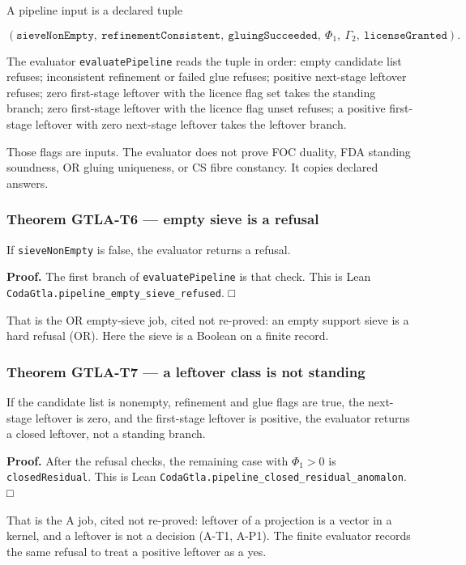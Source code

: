 \documentclass[
  11pt,
]{article}
\begin{document}
A pipeline input is a declared tuple

\[
(\texttt{sieveNonEmpty},\
\texttt{refinementConsistent},\
\texttt{gluingSucceeded},\
\Phi_1,\
\Gamma_2,\
\texttt{licenseGranted}).
\]

The evaluator \texttt{evaluatePipeline} reads the tuple in order: empty candidate list refuses; inconsistent refinement or failed glue refuses; positive next-stage leftover refuses; zero first-stage leftover with the licence flag set takes the standing branch; zero first-stage leftover with the licence flag unset refuses; a positive first-stage leftover with zero next-stage leftover takes the leftover branch.

Those flags are inputs. The evaluator does not prove FOC duality, FDA standing soundness, OR gluing uniqueness, or CS fibre constancy. It copies declared answers.

\subsubsection{Theorem GTLA-T6 --- empty sieve is a refusal}\label{theorem-gtla-t6-empty-sieve-is-a-refusal}

If \texttt{sieveNonEmpty} is false, the evaluator returns a refusal.

\textbf{Proof.} The first branch of \texttt{evaluatePipeline} is that check. This is Lean \nolinkurl{CodaGtla.pipeline_empty_sieve_refused}. □

That is the OR empty-sieve job, cited not re-proved: an empty support sieve is a hard refusal (OR). Here the sieve is a Boolean on a finite record.

\subsubsection{Theorem GTLA-T7 --- a leftover class is not standing}\label{theorem-gtla-t7-a-leftover-class-is-not-standing}

If the candidate list is nonempty, refinement and glue flags are true, the next-stage leftover is zero, and the first-stage leftover is positive, the evaluator returns a closed leftover, not a standing branch.

\textbf{Proof.} After the refusal checks, the remaining case with \(\Phi_1>0\) is \texttt{closedResidual}. This is Lean \nolinkurl{CodaGtla.pipeline_closed_residual_anomalon}. □

That is the A job, cited not re-proved: leftover of a projection is a vector in a kernel, and a leftover is not a decision (A-T1, A-P1). The finite evaluator records the same refusal to treat a positive leftover as a yes.
\end{document}
